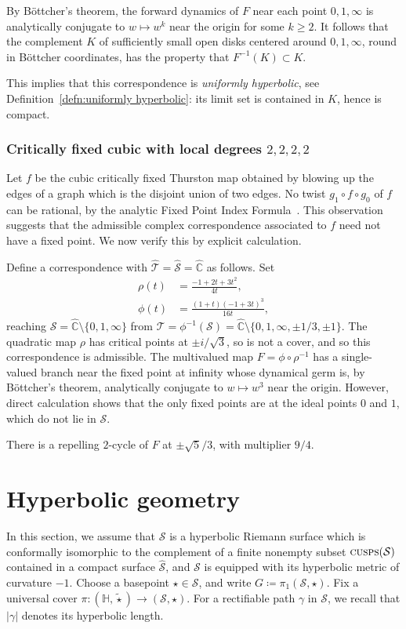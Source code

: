 \documentclass{amsart}
\newcommand\IH{{\mathbb{H}}}
\newcommand\C{{\mathbb{C}}}
\theoremstyle{definition}
\theoremstyle{remark}
\newcommand{\cT}{\mathcal{T}}
\newcommand{\cS}{\mathcal{S}}
\newcommand{\cusps}[1]{\text{\sc cusps}(#1)}
\begin{document}
By B\"ottcher's theorem, the forward dynamics of $F$ near each point $0,1,\infty$ is analytically conjugate to $w \mapsto w^k$ near the origin for some $k \geq 2$.  It follows that the complement $K$ of sufficiently small open disks centered around $0,1,\infty$, round in B\"ottcher coordinates, has the property that $F^{-1}(K) \subset K$. 

This implies that this correspondence is \emph{uniformly hyperbolic}, see Definition~\ref{defn:uniformly hyperbolic}: its limit set is contained in $K$, hence is compact.

 \subsubsection*{Critically fixed cubic with local degrees $2,2,2,2$} Let $f$ be the cubic critically fixed Thurston map obtained by blowing up the edges of a graph which is the disjoint union of two edges. No twist $g_1\circ f\circ g_0$ of $f$ can be rational, by the analytic Fixed Point Index Formula~\cite{milnor:dynamics}.  This observation suggests that the admissible complex correspondence associated to $f$ need not have a fixed point.  We now verify this by explicit calculation. 

Define a correspondence with $\widehat{\cT}=\widehat{\cS}=\widehat{\C}$ as follows. Set 
\begin{align*}
  \rho(t)&=\frac{-1+2t+3t^2}{4t},\\
  \phi(t)&=\frac{(1+t)(-1+3t)^3}{16t},
\end{align*}
reaching $\cS=\widehat{\C}\setminus\{0,1,\infty\}$ from $\cT=\phi^{-1}(\cS)=\widehat{\C}\setminus\{0,1,\infty,\pm 1/3, \pm 1\}$. The quadratic map $\rho$ has critical points at $\pm i/\sqrt{3}$, so is not a cover, and so this correspondence is admissible. The multivalued map $F=\phi\circ \rho^{-1}$ has a single-valued branch near the fixed point at infinity whose dynamical germ is, by B\"ottcher's theorem, analytically conjugate to $w \mapsto w^3$ near the origin.  However, direct calculation shows that the only fixed points are at the ideal points $0$ and $1$, which do not lie in $\cS$. 

There is a repelling $2$-cycle of $F$ at $\pm \sqrt{5}/3$, with multiplier $9/4$. 

\section{Hyperbolic geometry}\label{secn:hyperbolic}
In this section, we assume that $\cS$ is a hyperbolic Riemann surface which is conformally isomorphic to the complement of a finite nonempty subset $\cusps{\cS}$ contained in a compact surface $\widehat{\cS}$, and $\cS$ is equipped with its hyperbolic metric of curvature $-1$. Choose a basepoint $\star\in \cS$, and write $G\coloneqq\pi_1(\cS, \star)$.  Fix a universal cover $\pi\colon (\IH, \tilde{\star})\to (\cS, \star)$. For a rectifiable path $\gamma$ in $\cS$, we recall that $|\gamma|$ denotes its hyperbolic length.
\end{document}

